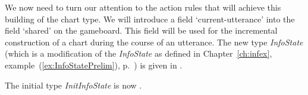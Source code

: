 We now need to turn our attention to the action rules that will
achieve this building of the chart type.  We will introduce a field
`current-utterance' into the field `shared' on the gameboard.  This
field will be used for the incremental construction of a chart during
the course of an utterance.  %
The
new type \textit{InfoState} (which is a modification of the
\textit{InfoState} as defined in Chapter~\ref{ch:infex},
example~(\ref{ex:InfoStatePrelim}), p.~\pageref{ex:InfoStatePrelim}) is given in \nexteg{}.
\begin{ex} 
  \label{ex:InfoState-chgram}
\end{ex}
The initial type \textit{InitInfoState} is now \nexteg{}.

